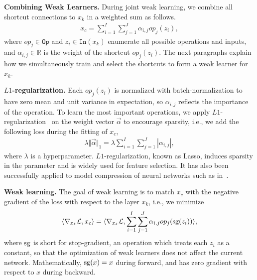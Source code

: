\textbf{Combining Weak Learners.} During joint weak learning, we combine all shortcut connections to 
$x_k$ in a weighted sum as follows. 
\begin{align}
    x_c = \sum _{i=1}^I \sum_{j=1}^J \alpha_{i,j} op_j(z_i),
    \label{eq:x_c_select}
\end{align}
where $op_j \in \texttt{Op}$ and $z_i \in \texttt{In}(x_k)$ enumerate all possible operations and inputs, and $\alpha_{i,j} \in \mathbb{R}$ is the weight of the shortcut $op_j(z_i)$. 
The next paragraphs explain how we simultaneously train and select the shortcuts to form a weak learner for $x_k$. 

\textbf{$L1$-regularization.} Each $op_j(z_i)$ is normalized with batch-normalization to have zero mean and unit variance in expectation, so $\alpha_{i,j}$ reflects 
the importance of the operation.
To learn the most important operations, we apply $L1$-regularization~\citep{lasso} on the weight vector $\vec{\alpha}$ to encourage sparsity, i.e.,
we add the following loss during the fitting of $x_c$,  
\begin{align}
    \lambda \Vert \vec{\alpha} \Vert_1 = 
    \lambda \sum_{i=1}^I \sum _{j=1}^J | \alpha _{i,j} |,
    \label{eq:x_c_select_loss}
\end{align} 
where $\lambda$ is a hyperparameter. $L1$-regularization, known as Lasso, induces sparsity in the parameter and is widely used for feature selection. It has also been successfully applied to model compression of neural networks such as in~\citep{huang2017condensenet}.


\textbf{Weak learning.} 
The goal of weak learning is to match $x_c$ with the negative gradient of the loss with respect to the layer $x_{k}$, i.e., 
we minimize 
\begin{align}
   \langle \nabla_{x_{k}} \mathcal{L}, x_c \rangle =  
   \langle \nabla_{x_{k}} \mathcal{L}, \sum _{i=1}^I \sum_{j=1}^J \alpha_{i,j} op_j( \textrm{sg}( z_i ) ) \rangle,
    \label{eq:x_c_linear_loss}
\end{align}
where $\textrm{sg}$ is short for stop-gradient, an operation which treats each $z_i$ as a constant, so that the optimization of weak learners does not 
affect the current network. Mathematically, $\textrm{sg}(x) = x$ during forward, and has zero gradient with respect to $x$ during backward.

